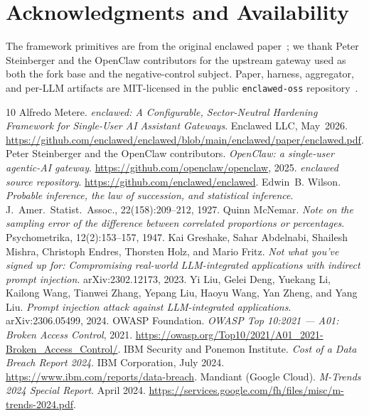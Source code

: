\documentclass[11pt]{article}
\begin{document}
\section*{Acknowledgments and Availability}

The framework primitives are from the original enclawed
paper~\cite{Metere2026enclawed}; we thank Peter Steinberger and the
OpenClaw contributors for the upstream gateway used as both the
fork base and the negative-control subject. Paper, harness,
aggregator, and per-LLM artifacts are MIT-licensed in the public
\texttt{enclawed-oss}
repository~\cite{enclawedRepo}.

{\footnotesize
\begin{thebibliography}{10}
Alfredo Metere.
\emph{enclawed: A Configurable, Sector-Neutral Hardening Framework for
Single-User AI Assistant Gateways}. Enclawed LLC, May~2026.
\url{https://github.com/enclawed/enclawed/blob/main/enclawed/paper/enclawed.pdf}.
Peter Steinberger and the OpenClaw contributors.
\emph{OpenClaw: a single-user agentic-AI gateway}.
\url{https://github.com/openclaw/openclaw}, 2025.
\emph{enclawed source repository}.
\url{https://github.com/enclawed/enclawed}.
Edwin~B. Wilson.
\emph{Probable inference, the law of succession, and statistical inference}.
J.~Amer.\ Statist.\ Assoc., 22(158):209--212, 1927.
Quinn McNemar.
\emph{Note on the sampling error of the difference between correlated
proportions or percentages}.
Psychometrika, 12(2):153--157, 1947.
Kai Greshake, Sahar Abdelnabi, Shailesh Mishra, Christoph Endres,
Thorsten Holz, and Mario Fritz.
\emph{Not what you've signed up for: Compromising real-world
LLM-integrated applications with indirect prompt injection}.
arXiv:2302.12173, 2023.
Yi Liu, Gelei Deng, Yuekang Li, Kailong Wang, Tianwei Zhang,
Yepang Liu, Haoyu Wang, Yan Zheng, and Yang Liu.
\emph{Prompt injection attack against LLM-integrated applications}.
arXiv:2306.05499, 2024.
OWASP Foundation.
\emph{OWASP Top 10:2021 --- A01: Broken Access Control}, 2021.
\url{https://owasp.org/Top10/2021/A01_2021-Broken_Access_Control/}.
IBM Security and Ponemon Institute.
\emph{Cost of a Data Breach Report 2024}. IBM Corporation, July 2024.
\url{https://www.ibm.com/reports/data-breach}.
Mandiant (Google Cloud).
\emph{M-Trends 2024 Special Report}. April 2024.
\url{https://services.google.com/fh/files/misc/m-trends-2024.pdf}.
\end{thebibliography}
}
\end{document}
